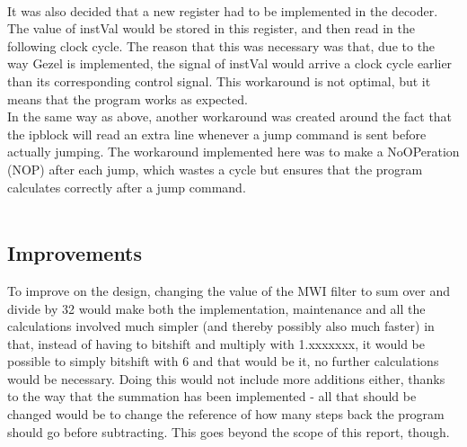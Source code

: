 \documentclass[12pt,a4paper]{article}
\begin{document}
\\
It was also decided that a new register had to be implemented in the decoder. The value of instVal would be stored in this register, and then read in the following clock cycle. The reason that this was necessary was that, due to the way Gezel is implemented, the signal of instVal would arrive a clock cycle earlier than its corresponding control signal. This workaround is not optimal, but it means that the program works as expected.\\
In the same way as above, another workaround was created around the fact that the ipblock will read an extra line whenever a jump command is sent before actually jumping. The workaround implemented here was to make a NoOPeration (NOP) after each jump, which wastes a cycle but ensures that the program calculates correctly after a jump command.\\
\\

\subsection{Improvements}
To improve on the design, changing the value of the MWI filter to sum over and divide by 32 would make both the implementation, maintenance and all the calculations involved much simpler (and thereby possibly also much faster) in that, instead of having to bitshift and multiply with 1.xxxxxxx, it would be possible to simply bitshift with 6 and that would be it, no further calculations would be necessary. Doing this would not include more additions either, thanks to the way that the summation has been implemented - all that should be changed would be to change the reference of how many steps back the program should go before subtracting. This goes beyond the scope of this report, though.\\
\end{document}
